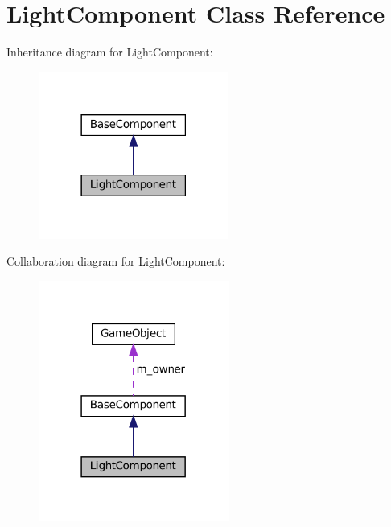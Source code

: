 \hypertarget{classLightComponent}{}\section{Light\+Component Class Reference}
\label{classLightComponent}


Inheritance diagram for Light\+Component\+:
\nopagebreak
\begin{figure}[H]
\begin{center}
\leavevmode
\includegraphics[width=177pt]{classLightComponent__inherit__graph}
\end{center}
\end{figure}


Collaboration diagram for Light\+Component\+:
\nopagebreak
\begin{figure}[H]
\begin{center}
\leavevmode
\includegraphics[width=178pt]{classLightComponent__coll__graph}
\end{center}
\end{figure}
